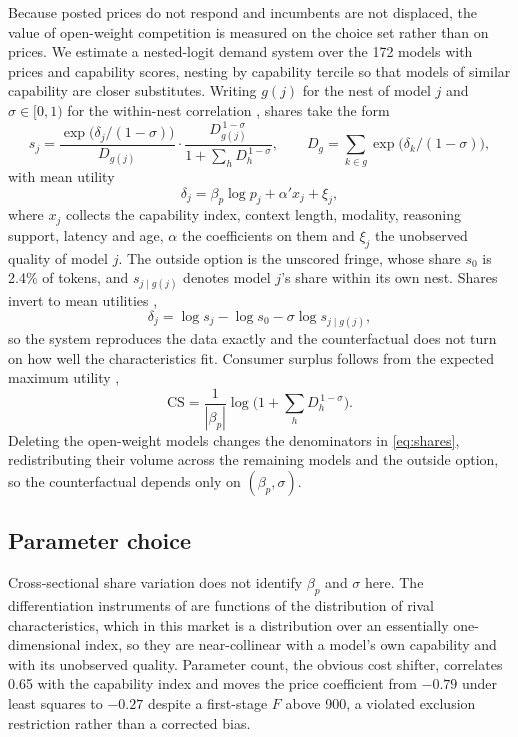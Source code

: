 \documentclass{article}
\newcommand{\CFmodels}{172}
\newcommand{\CFoutside}{2.4}
\begin{document}
Because posted prices do not respond and incumbents are not displaced, the value of
open-weight competition is measured on the choice set rather than on prices. We estimate a
nested-logit demand system over the \CFmodels{} models with prices and capability scores,
nesting by capability tercile so that models of similar capability are closer substitutes.
Writing $g(j)$ for the nest of model $j$ and $\sigma \in [0,1)$ for the within-nest
correlation \citep{cardell1997,berry1994}, shares take the form
\begin{equation}
s_j = \frac{\exp\!\big(\delta_j/(1-\sigma)\big)}{D_{g(j)}} \cdot
      \frac{D_{g(j)}^{\,1-\sigma}}{1 + \sum_h D_h^{\,1-\sigma}},
\qquad
D_g = \sum_{k \in g} \exp\!\big(\delta_k/(1-\sigma)\big),
\label{eq:shares}
\end{equation}
with mean utility
\begin{equation}
\delta_j = \beta_p \log p_j + \alpha' x_j + \xi_j ,
\label{eq:delta}
\end{equation}
where $x_j$ collects the capability index, context length, modality, reasoning support,
latency and age, $\alpha$ the coefficients on them and $\xi_j$ the unobserved quality of model
$j$. The outside option is the unscored fringe, whose share $s_0$ is \CFoutside\% of tokens,
and $s_{j \mid g(j)}$ denotes model $j$'s share within its own nest. Shares invert to mean
utilities \citep{berry1994},
\begin{equation}
\delta_j = \log s_j - \log s_0 - \sigma \log s_{j \mid g(j)} ,
\label{eq:inversion}
\end{equation}
so the system reproduces the data exactly and the counterfactual does not turn on how well
the characteristics fit. Consumer surplus follows from the expected maximum utility \citep{small1981,mcfadden1974},
\begin{equation}
\mathrm{CS} = \frac{1}{|\beta_p|} \log \Big( 1 + \sum_h D_h^{\,1-\sigma} \Big) .
\label{eq:cs}
\end{equation}
Deleting the open-weight models changes the denominators in \eqref{eq:shares},
redistributing their volume across the remaining models and the outside option, so the
counterfactual depends only on $(\beta_p, \sigma)$.

\subsection{Parameter choice}

Cross-sectional share variation does not identify $\beta_p$ and $\sigma$ here. The
differentiation instruments of \citet{gandhi2019} are functions of the distribution of rival
characteristics, which in this market is a distribution over an essentially one-dimensional
index, so they are near-collinear with a model's own capability and with its unobserved
quality. Parameter count, the obvious cost shifter, correlates 0.65 with the capability index
and moves the price coefficient from $-0.79$ under least squares to $-0.27$ despite a
first-stage $F$ above 900, a violated exclusion restriction rather than a corrected bias.
\end{document}
